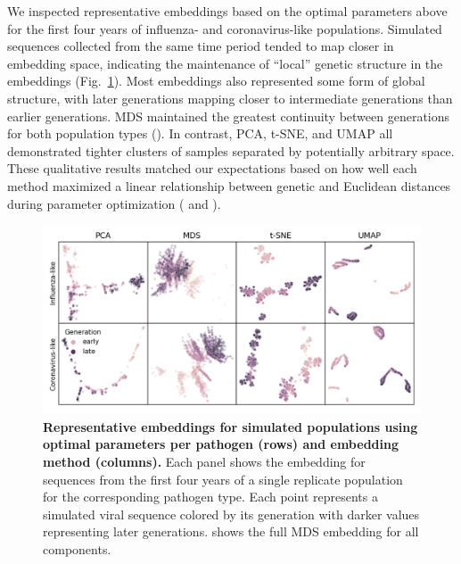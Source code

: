 \documentclass[10pt,letterpaper]{article}
\begin{document}
We inspected representative embeddings based on the optimal parameters above for the first four years of influenza- and coronavirus-like populations.
Simulated sequences collected from the same time period tended to map closer in embedding space, indicating the maintenance of ``local'' genetic structure in the embeddings (Fig.~\ref{fig:simulated-populations-representative-embeddings}).
Most embeddings also represented some form of global structure, with later generations mapping closer to intermediate generations than earlier generations.
MDS maintained the greatest continuity between generations for both population types ().
In contrast, PCA, t-SNE, and UMAP all demonstrated tighter clusters of samples separated by potentially arbitrary space.
These qualitative results matched our expectations based on how well each method maximized a linear relationship between genetic and Euclidean distances during parameter optimization ( and ).

\begin{figure}[!h]
\includegraphics[width=\columnwidth]{figures/simulated-populations-representative-embeddings.png}
\caption{{\bf Representative embeddings for simulated populations using optimal parameters per pathogen (rows) and embedding method (columns).}
  Each panel shows the embedding for sequences from the first four years of a single replicate population for the corresponding pathogen type.
  Each point represents a simulated viral sequence colored by its generation with darker values representing later generations.
   shows the full MDS embedding for all components.}
\label{fig:simulated-populations-representative-embeddings}
\end{figure}
\end{document}
